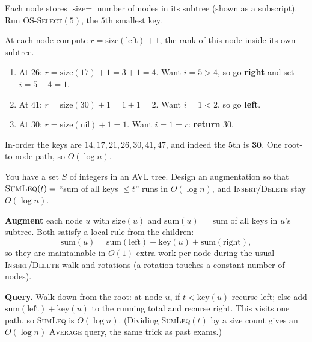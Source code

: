 \documentclass[11pt]{article}
\begin{document}
\begin{examplebox}
Each node stores $\text{size}=$ number of nodes in its subtree (shown as a subscript). Run \textsc{OS-Select}$(5)$, the $5$th smallest key.

\begin{center}
\end{center}

\begin{answerband}
At each node compute $r=\text{size}(\text{left})+1$, the rank of this node inside its own subtree.
\begin{enumerate}[leftmargin=1.6em,itemsep=2pt]
  \item At $26$: $r=\text{size}(17)+1=3+1=4$. Want $i=5>4$, so go \textbf{right} and set $i=5-4=1$.
  \item At $41$: $r=\text{size}(30)+1=1+1=2$. Want $i=1<2$, so go \textbf{left}.
  \item At $30$: $r=\text{size}(\text{nil})+1=1$. Want $i=1=r$: \textcolor{greenO}{\textbf{return }$30$}.
\end{enumerate}
In-order the keys are $14,17,21,26,30,41,47$, and indeed the $5$th is $\mathbf{30}$. One root-to-node path, so $O(\log n)$.
\end{answerband}
\end{examplebox}

\begin{examplebox}
You have a set $S$ of integers in an AVL tree. Design an augmentation so that $\textsc{SumLeq}(t)=$ ``sum of all keys $\leq t$'' runs in $O(\log n)$, and \textsc{Insert}/\textsc{Delete} stay $O(\log n)$.

\begin{answerband}
\textbf{Augment} each node $u$ with $\text{size}(u)$ and $\text{sum}(u)=$ sum of all keys in $u$'s subtree. Both satisfy a local rule from the children:
\[
  \text{sum}(u)=\text{sum}(\text{left})+\text{key}(u)+\text{sum}(\text{right}),
\]
so they are maintainable in $O(1)$ extra work per node during the usual \textsc{Insert}/\textsc{Delete} walk and rotations (a rotation touches a constant number of nodes).

\textbf{Query.} Walk down from the root: at node $u$, if $t<\text{key}(u)$ recurse left; else add $\text{sum}(\text{left})+\text{key}(u)$ to the running total and recurse right. This visits one path, so \textsc{SumLeq} is \textcolor{violetT}{$O(\log n)$}. (Dividing \textsc{SumLeq}$(t)$ by a size count gives an $O(\log n)$ \textsc{Average} query, the same trick as past exams.)
\end{answerband}
\end{examplebox}
\end{document}
